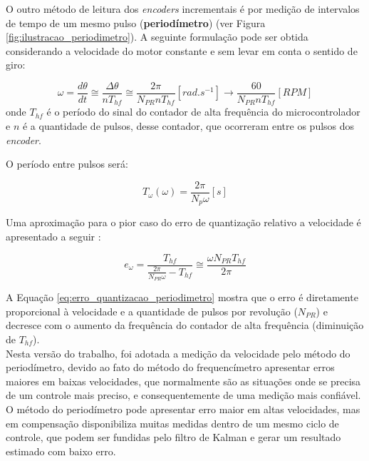 O outro método de leitura dos \emph{encoders} incrementais é por medição de intervalos de tempo de um mesmo pulso (\textbf{periodímetro}) (ver Figura \ref{fig:ilustracao_periodimetro}). A seguinte formulação pode ser obtida considerando a velocidade do motor constante e sem levar em conta o sentido de giro:

\begin{equation}
    \omega = \frac{d\theta}{dt} \cong \frac{\Delta{\theta}}{nT_{hf}} \cong \frac{2\pi}{N_{PR} n T_{hf}} [rad.s^{-1}] \xrightarrow{} \frac{60}{N_{PR} n T_{hf}} [RPM]
    \label{eq:omega_periodimetro}
\end{equation}
onde $T_{hf}$ é o período do sinal do contador de alta frequência do microcontrolador e $n$ é a quantidade de pulsos, desse contador, que ocorreram entre os pulsos dos \emph{encoder}.

O período entre pulsos será:

\begin{equation}
    T_{\omega}(\omega) = \frac{2\pi}{N_{p}\omega} [s]
\end{equation}

Uma aproximação para o pior caso do erro de quantização relativo a velocidade é apresentado a seguir \cite{analise_incr_enc}:

\begin{equation}
    e_{\omega} = \frac{T_{hf}}{ \frac{2\pi}{N_{PR} \omega} - T_{hf} } \cong \frac{\omega N_{PR} T_{hf}}{2\pi}
    \label{eq:erro_quantizacao_periodimetro}
\end{equation}

A Equação \ref{eq:erro_quantizacao_periodimetro} mostra que o erro é diretamente proporcional à velocidade e a quantidade de pulsos por revolução ($N_{PR}$) e decresce com o aumento da frequência do contador de alta frequência (diminuição de $T_{hf}$).\\

Nesta versão do trabalho, foi adotada a medição da velocidade pelo método do periodímetro, devido ao fato do método do frequencímetro apresentar erros maiores em baixas velocidades, que normalmente são as situações onde se precisa de um controle mais preciso, e consequentemente de uma medição mais confiável. O método do periodímetro pode apresentar erro maior em altas velocidades, mas em compensação disponibiliza muitas medidas dentro de um mesmo ciclo de controle, que podem ser fundidas pelo filtro de Kalman e gerar um resultado estimado com baixo erro.\\

